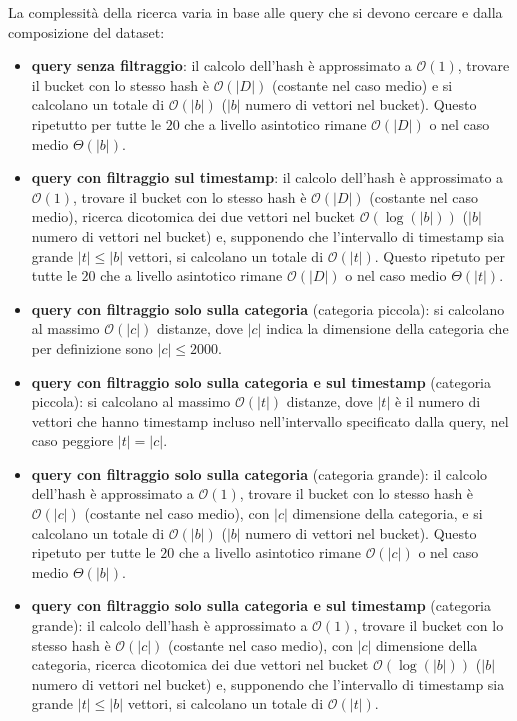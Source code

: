 La complessità della ricerca varia in base alle query che si devono cercare e dalla 
composizione del dataset:
\begin{itemize}
    \item \textbf{query senza filtraggio}: il calcolo dell'hash è approssimato a $\mathcal{O}(1)$,
    trovare il bucket con lo stesso hash è $\mathcal{O}(|D|)$ (costante nel caso medio) e 
    si calcolano un totale di $\mathcal{O}(|b|)$ ($|b|$ numero di vettori nel bucket). 
    Questo ripetutto per tutte le $20$ che a livello asintotico rimane $\mathcal{O}(|D|)$
    o nel caso medio $\Theta(|b|)$.
    \item \textbf{query con filtraggio sul timestamp}: il calcolo dell'hash è approssimato a $\mathcal{O}(1)$,
    trovare il bucket con lo stesso hash è $\mathcal{O}(|D|)$ (costante nel caso medio),
    ricerca dicotomica dei due vettori nel bucket $\mathcal{O}(\log(|b|))$ ($|b|$ numero di vettori nel bucket) 
    e, supponendo che l'intervallo di timestamp sia grande $|t|\le |b|$ vettori, 
    si calcolano un totale di $\mathcal{O}(|t|)$. 
    Questo ripetuto per tutte le $20$ che a livello asintotico rimane $\mathcal{O}(|D|)$
    o nel caso medio $\Theta(|t|)$.
    \item \textbf{query con filtraggio solo sulla categoria} (categoria piccola): 
    si calcolano al massimo $\mathcal{O}(|c|)$ distanze, dove $|c|$ indica la dimensione 
    della categoria che per definizione sono $|c|\le 2000$.
    \item \textbf{query con filtraggio solo sulla categoria e sul timestamp} (categoria piccola): 
    si calcolano al massimo $\mathcal{O}(|t|)$ distanze, dove $|t|$ è il numero 
    di vettori che hanno timestamp incluso nell'intervallo specificato dalla query,
    nel caso peggiore $|t|=|c|$. 
    \item \textbf{query con filtraggio solo sulla categoria} (categoria grande):
    il calcolo dell'hash è approssimato a $\mathcal{O}(1)$,
    trovare il bucket con lo stesso hash è $\mathcal{O}(|c|)$ (costante nel caso medio), con
    $|c|$ dimensione della categoria, e 
    si calcolano un totale di $\mathcal{O}(|b|)$ ($|b|$ numero di vettori nel bucket).
    Questo ripetuto per tutte le $20$ che a livello asintotico rimane $\mathcal{O}(|c|)$
    o nel caso medio $\Theta(|b|)$.
    \item \textbf{query con filtraggio solo sulla categoria e sul timestamp} (categoria grande): 
    il calcolo dell'hash è approssimato a $\mathcal{O}(1)$,
    trovare il bucket con lo stesso hash è $\mathcal{O}(|c|)$ (costante nel caso medio), con
    $|c|$ dimensione della categoria, 
    ricerca dicotomica dei due vettori nel bucket $\mathcal{O}(\log(|b|))$ ($|b|$ numero di vettori nel bucket) 
    e, supponendo che l'intervallo di timestamp sia grande $|t|\le |b|$ vettori, 
    si calcolano un totale di $\mathcal{O}(|t|)$.
\end{itemize}

